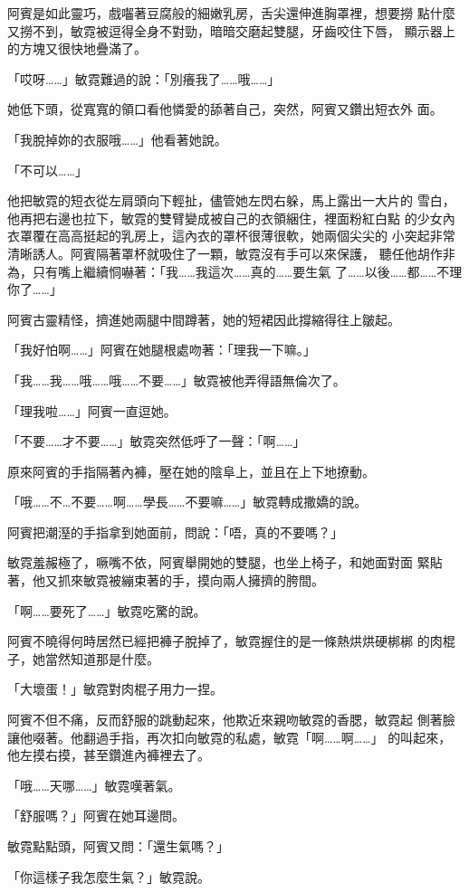 阿賓是如此靈巧，戲囓著豆腐般的細嫩乳房，舌尖還伸進胸罩裡，想要撈
點什麼又撈不到，敏霓被逗得全身不對勁，暗暗交磨起雙腿，牙齒咬住下唇，
顯示器上的方塊又很快地疊滿了。

「哎呀……」敏霓難過的說：「別癢我了……哦……」

她低下頭，從寬寬的領口看他憐愛的舔著自己，突然，阿賓又鑽出短衣外
面。

「我脫掉妳的衣服哦……」他看著她說。

「不可以……」

他把敏霓的短衣從左肩頭向下輕扯，儘管她左閃右躲，馬上露出一大片的
雪白，他再把右邊也拉下，敏霓的雙臂變成被自己的衣領綑住，裡面粉紅白點
的少女內衣罩覆在高高挺起的乳房上，這內衣的罩杯很薄很軟，她兩個尖尖的
小突起非常清晰誘人。阿賓隔著罩杯就吸住了一顆，敏霓沒有手可以來保護，
聽任他胡作非為，只有嘴上繼續恫嚇著：「我……我這次……真的……要生氣
了……以後……都……不理你了……」

阿賓古靈精怪，擠進她兩腿中間蹲著，她的短裙因此撐縮得往上皺起。

「我好怕啊……」阿賓在她腿根處吻著：「理我一下嘛。」

「我……我……哦……哦……不要……」敏霓被他弄得語無倫次了。

「理我啦……」阿賓一直逗她。

「不要……才不要……」敏霓突然低呼了一聲：「啊……」

原來阿賓的手指隔著內褲，壓在她的陰阜上，並且在上下地撩動。

「哦……不…不要……啊……學長……不要嘛……」敏霓轉成撒嬌的說。

阿賓把潮溼的手指拿到她面前，問說：「唔，真的不要嗎？」

敏霓羞赧極了，噘嘴不依，阿賓舉開她的雙腿，也坐上椅子，和她面對面
緊貼著，他又抓來敏霓被繃束著的手，摸向兩人擁擠的胯間。

「啊……要死了……」敏霓吃驚的說。

阿賓不曉得何時居然已經把褲子脫掉了，敏霓握住的是一條熱烘烘硬梆梆
的肉棍子，她當然知道那是什麼。

「大壞蛋！」敏霓對肉棍子用力一捏。

阿賓不但不痛，反而舒服的跳動起來，他欺近來親吻敏霓的香腮，敏霓起
側著臉讓他啜著。他翻過手指，再次扣向敏霓的私處，敏霓「啊……啊……」
的叫起來，他左摸右摸，甚至鑽進內褲裡去了。

「哦……天哪……」敏霓嘆著氣。

「舒服嗎？」阿賓在她耳邊問。

敏霓點點頭，阿賓又問：「還生氣嗎？」

「你這樣子我怎麼生氣？」敏霓說。

